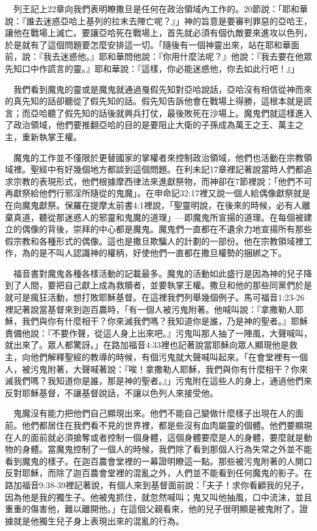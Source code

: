 \documentclass{book}
\begin{document}
　列王記上22章向我們表明瞭撒旦是任何在政治領域內工作的。20節說：「耶和華說：『誰去迷惑亞哈上基列的拉末去陣亡呢？』」神的旨意是要審判罪惡的亞哈王，讓他在戰場上滅亡。要讓亞哈死在戰場上，首先就必須有個仇敵要來進攻以色列，於是就有了這個問題要怎麼安排這一切。「隨後有一個神靈出來，站在耶和華面前，說：『我去迷惑他。』耶和華問他說：『你用什麼法呢？』他說：『我去要在他眾先知口中作謊言的靈。』耶和華說：『這樣，你必能迷惑他，你去如此行吧！』」

　我們看到魔鬼的靈或是魔鬼就通過戛假先知對亞哈說話，亞哈沒有相信從神而來的真先知的話卻聽從了假先知的話。假先知告訴他會在戰場上得勝，這根本就是謊言；而亞哈聽了假先知的話後就興兵打仗，最後敗死在沙場上。魔鬼們就這樣進入了政治領域，他們要推翻亞哈的目的是要阻止大衛的子孫成為萬王之王、萬主之主，重新執掌王權。

　魔鬼的工作並不僅限於更替國家的掌權者來控制政治領域，他們也活動在宗教領域裡。聖經中有好幾個地方都談到這個問題。在利未記17章裡記著說當時人們都追求宗教的表現形式，他們根據摩西律法來進獻祭物，而神卻在7節裡說：「他們不可再獻祭給他們行邪淫所隨從的鬼魔」。在申命記32:17裡又說一個人給偶像獻祭就是在向魔鬼獻祭。保羅在提摩太前書4:1裡說，「聖靈明說，在後來的時候，必有人離棄真道，聽從那迷惑人的邪靈和鬼魔的道理」---即魔鬼所宣揚的道理。在每個被建立的偶像的背後，崇拜的中心都是魔鬼。魔鬼們一直都在不遺余力地宣揚所有那些假宗教和各種形式的偶像。這也是撒旦欺騙人的計劃的一部份。他在宗教領域裡工作，為的是不叫人認識神的權柄，好使他們一直都在撒旦權勢的捆綁之下。

　福音書對魔鬼各種各樣活動的記載最多。魔鬼的活動如此盛行是因為神的兒子降到了人間，要把自己獻上成為救贖者，並要執掌王權。撒旦和他的那些同黨們於是就可是瘋狂活動，想打敗耶穌基督。在這裡我們列舉幾個例子。馬可福音1:23-26裡記著說當基督來到迦百農時，「有一個人被污鬼附著。他喊叫說：『拿撒勒人耶穌，我們與你有什麼相干？你來滅我們嗎？我知道你是誰，乃是神的聖者。』耶穌責備他說：『不要作聲，從這人身上出來吧。』污鬼叫那人抽了一陣風，大聲喊叫，就出來了。眾人都驚訝。」在路加福音4:33裡也記著說當耶穌向眾人顯現他是救主，向他們解釋聖經的教導的時候，有個污鬼就大聲喊叫起來。「在會堂裡有一個人，被污鬼附著，大聲喊著說：『唉！拿撒勒人耶穌，我們與你有什麼相干？你來滅我們嗎？我知道你是誰，那是神的聖者。』」污鬼附在這些人的身上，通過他們來反對耶穌基督，不讓基督說話，不讓以色列人來接受他。

　鬼魔沒有能力把他們自己顯現出來。他們不能自己變做什麼樣子出現在人的面前。他們都居住在我們看不見的世界裡，都是些沒有血肉屬靈的個體。他們要顯現在人的面前就必須搶奪或者控制一個身體，這個身體要麼是人的身體，要麼就是動物的身體。當魔鬼控制了一個人的時候，我們除了看到那個人行為失常之外並不能看到魔鬼的樣子。在迦百農會堂裡的一幕證明瞭這一點。那些被污鬼附著的人開口反對耶穌，而除了迦百農會堂裡的混亂之外，人們並不能看到任何魔鬼的影子。在路加福音9:38-39裡記著說，有個人來到基督面前說：「夫子！求你看顧我的兒子，因為他是我的獨生子。他被鬼抓住，就忽然喊叫；鬼又叫他抽風，口中流沫，並且重重的傷害他，難以離開他。」在這個父親看來，他的兒子很明顯是被鬼附了，證據就是他獨生兒子身上表現出來的混亂的行為。
\end{document}
